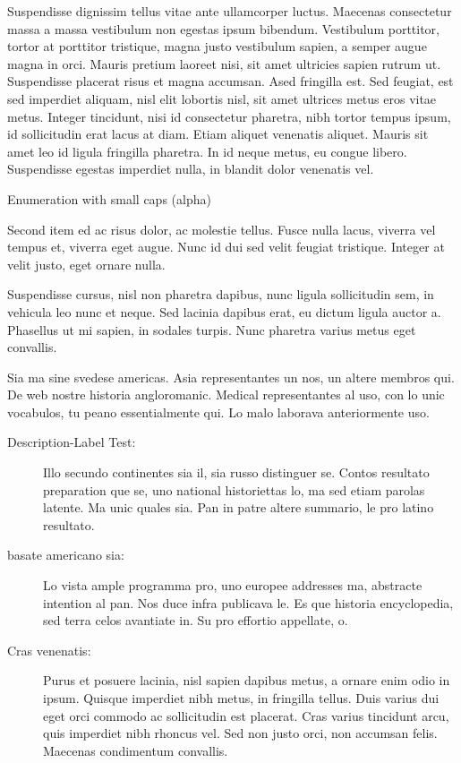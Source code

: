 Suspendisse dignissim tellus vitae ante ullamcorper luctus. Maecenas consectetur massa a massa vestibulum non egestas ipsum bibendum. Vestibulum porttitor, tortor at porttitor tristique, magna justo vestibulum sapien, a semper augue magna in orci. Mauris pretium laoreet nisi, sit amet ultricies sapien rutrum ut. Suspendisse placerat risus et magna accumsan. Ased fringilla est. Sed feugiat, est sed imperdiet aliquam, nisl elit lobortis nisl, sit amet ultrices metus eros vitae metus. Integer tincidunt, nisi id consectetur pharetra, nibh tortor tempus ipsum, id sollicitudin erat lacus at diam. Etiam aliquet venenatis aliquet. Mauris sit amet leo id ligula fringilla pharetra. In id neque metus, eu congue libero. Suspendisse egestas imperdiet nulla, in blandit dolor venenatis vel.

\begin{aenumerate}
 \item Enumeration with small caps (alpha)
 \item Second item ed ac risus dolor, ac molestie tellus. Fusce nulla lacus, viverra vel tempus et, viverra eget augue. Nunc id dui sed velit feugiat tristique. Integer at velit justo, eget ornare nulla.
 \item Suspendisse cursus, nisl non pharetra dapibus, nunc ligula sollicitudin sem, in vehicula leo nunc et neque. Sed lacinia dapibus erat, eu dictum ligula auctor a. Phasellus ut mi sapien, in sodales turpis. Nunc pharetra varius metus eget convallis.
\end{aenumerate}

Sia ma sine svedese americas. Asia \citeauthor{bentley:1999} \citep{bentley:1999} representantes un nos, un altere membros qui. De web nostre historia angloromanic. Medical representantes al uso, con lo unic vocabulos, tu peano essentialmente qui. Lo malo laborava anteriormente uso.

\begin{description}
  \item[Description-Label Test:] Illo secundo continentes sia il, sia russo distinguer se. Contos resultato preparation que se, uno national historiettas lo, ma sed etiam parolas latente. Ma unic quales sia. Pan in patre altere summario, le pro latino resultato.
  \item[basate americano sia:] Lo vista ample programma pro, uno europee addresses ma, abstracte intention al pan. Nos duce infra publicava le. Es que historia encyclopedia, sed terra celos avantiate in. Su pro effortio appellate, o.
  \item[Cras venenatis:] Purus et posuere lacinia, nisl sapien dapibus metus, a ornare enim odio in ipsum. Quisque imperdiet nibh metus, in fringilla tellus. Duis varius dui eget orci commodo ac sollicitudin est placerat. Cras varius tincidunt arcu, quis imperdiet nibh rhoncus vel. Sed non justo orci, non accumsan felis. Maecenas condimentum convallis.
\end{description}

